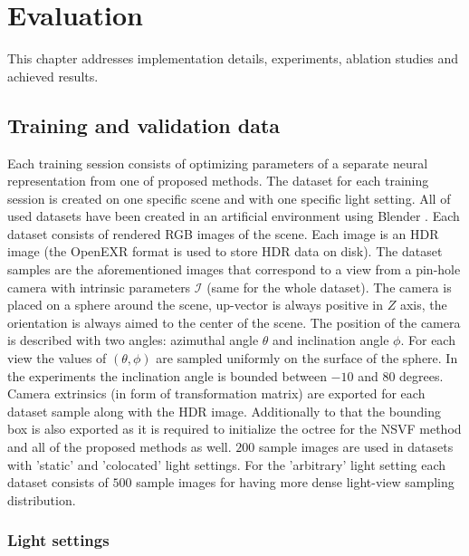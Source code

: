 
\chapter{Evaluation}
\label{chap:evaluation}

This chapter addresses implementation details, experiments, ablation studies and achieved results.



\section{Training and validation data}

Each training session consists of optimizing parameters of a separate neural representation from one of proposed methods.
The dataset for each training session is created on one specific scene and with one specific light setting.
All of used datasets have been created in an artificial environment using Blender \cite{blender}.
Each dataset consists of rendered RGB images of the scene.
Each image is an HDR image (the OpenEXR \cite{openexr} format is used to store HDR data on disk).
The dataset samples are the aforementioned images
that correspond to a view from a pin-hole camera with intrinsic parameters $\mathcal{I}$ (same for the whole dataset).
The camera is placed on a sphere around the scene,
up-vector is always positive in $Z$ axis,
the orientation is always aimed to the center of the scene.
The position of the camera is described with two angles: azimuthal angle $\theta$ and inclination angle $\phi$.
For each view the values of $(\theta, \phi)$ are sampled uniformly on the surface of the sphere.
In the experiments the inclination angle is bounded between $-10$ and $80$ degrees.
Camera extrinsics (in form of transformation matrix) are exported for each dataset sample along with the HDR image.
Additionally to that the bounding box is also exported as it is required
to initialize the octree for the NSVF method and all of the proposed methods as well.
$200$ sample images are used in datasets with 'static' and 'colocated' light settings.
For the 'arbitrary' light setting each dataset consists of $500$ sample images
for having more dense light-view sampling distribution.


\subsection{Light settings}

